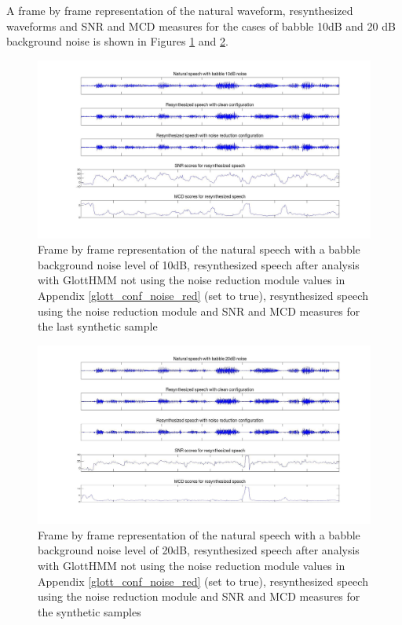 A frame by frame representation of the natural waveform, resynthesized waveforms and SNR and MCD measures for the cases of babble 10dB and 20 dB background noise is shown in Figures \ref{fig:frame_by_frame_babble10} and \ref{fig:frame_by_frame_babble20}.

\begin{figure}[!htbp]
\includegraphics[width=\textwidth]{images/babble10_frame_by_frame.jpg}
\caption{Frame by frame representation of the natural speech with a babble background noise level of 10dB, resynthesized speech after analysis with GlottHMM not using the noise reduction module values in Appendix \ref{glott_conf_noise_red} (set to true), resynthesized speech using the noise reduction module and SNR and MCD measures for the last synthetic sample}
\label{fig:frame_by_frame_babble10}
\end{figure}

\begin{figure}[!htbp]
\includegraphics[width=\textwidth]{images/babble20_frame_by_frame.pdf}
\caption{Frame by frame representation of the natural speech with a babble background noise level of 20dB, resynthesized speech after analysis with GlottHMM not using the noise reduction module values in Appendix \ref{glott_conf_noise_red} (set to true), resynthesized speech using the noise reduction module and SNR and MCD measures for the synthetic samples}
\label{fig:frame_by_frame_babble20}
\end{figure}

